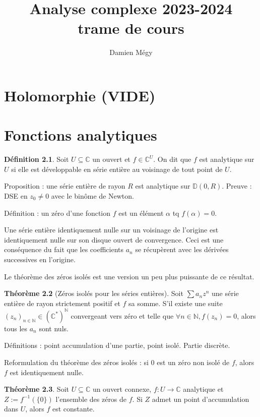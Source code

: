 \documentclass[11pt,a4paper]{book}
\title{Analyse complexe 2023-2024\\ trame de cours}
\author{Damien Mégy}
\newcommand{\N}{\mathbb{N}}
\newcommand{\D}{\mathbb{D}}
\newcommand{\C}{\mathbb{C}}
\theoremstyle{definition}
\newtheorem{theoreme}{Th\'eor\`eme}[section]
\newtheorem{definition}[theoreme]{D\'efinition}
\theoremstyle{plain}
\begin{document}
\maketitle
\tableofcontents

\chapter{Holomorphie (VIDE)}

\chapter{Fonctions analytiques}

\begin{definition}
Soit $U\subseteq \C$ un ouvert et $f \in \C^U$.
On dit que $f$ est analytique sur $U$ si elle est développable en série entière au voisinage de tout point de $U$.
\end{definition}

Proposition : une série entière de rayon $R$ est analytique sur $\D(0,R)$. Preuve : DSE en $z_0\neq 0$ avec le binôme de Newton.

Définition : un zéro d'une fonction $f$ est un élément $\alpha$ tq $f(\alpha)=0$.


Une série entière identiquement nulle sur un voisinage de l'origine est identiquement nulle sur son disque ouvert de convergence.
Ceci est une conséquence du fait que les coefficients $a_n$ se récupèrent avec les dérivées successives en l'origine. 

Le théorème des zéros isolés est une version un peu plus puissante de ce résultat.

\begin{theoreme}[Zéros isolés pour les séries entières]
Soit $\sum a_nz^n$ une série entière de rayon strictement positif et $f$ sa somme.
S'il existe une suite $(z_n)_{n\in \N} \in (\C^*)^\N$ convergeant vers zéro et telle que $\forall n\in\N, f(z_n)=0$, alors tous les $a_n$ sont nuls.
\end{theoreme}



Définitions : point accumulation d'une partie, point isolé. Partie discrète.

Reformulation du théorème des zéros isolés : si $0$ est un zéro non isolé de $f$, alors $f$ est identiquement nulle.

\begin{theoreme}
Soit $U\subseteq \C$ un ouvert connexe,  $f:U\to\C$ analytique et $Z:=f^{-1}(\{0\})$ l'ensemble des zéros de $f$.
Si $Z$ admet un point d'accumulation dans $U$, alors $f$ est constante.
\end{theoreme}
\end{document}
